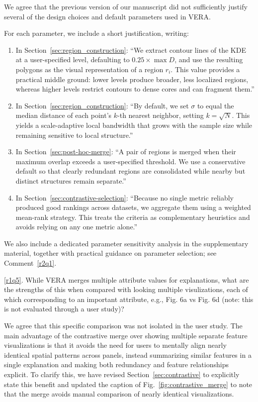 \documentclass[11pt]{article}
\newcounter{rtaskno}
\newcommand{\rtask}[1]{\refstepcounter{rtaskno}\label{#1}}
\newcommand{\reviewc}[2]{\begin{leftbar}\noindent\rtask{#1}\ref{#1}. #2\end{leftbar}\vspace*{-4mm}}
\newcommand{\answer}[1]{\noindent #1\par\vspace{2mm}}
\newlength{\leftbarwidth}
\newlength{\leftbarsep}
\renewenvironment{leftbar}{%
    \def\FrameCommand{{\color{black}{\vrule width \leftbarwidth\relax\hspace {\leftbarsep}}}}%
    \MakeFramed {\advance \hsize -\width \FrameRestore }%
}{\endMakeFramed}
\begin{document}
\answer{%
We agree that the previous version of our manuscript did not sufficiently justify several of the design choices and default parameters used in VERA.

For each parameter, we include a short justification, writing:
\begin{enumerate}
    \item In Section~\ref{sec:region_construction}: ``We extract contour lines of the KDE at a user-specified level, defaulting to $0.25 \times \max D$, and use the resulting polygons as the visual representation of a region $r_i$.
    This value provides a practical middle ground: lower levels produce broader, less localized regions, whereas higher levels restrict contours to dense cores and can fragment them.''
    \item In Section~\ref{sec:region_construction}: ``By default, we set $\sigma$ to equal the median distance of each point's $k$-th nearest neighbor, setting $k=\sqrt{N}$. This yields a scale-adaptive local bandwidth that grows with the sample size while remaining sensitive to local structure.''
    \item In Section~\ref{sec:post-hoc-merge}: ``A pair of regions is merged when their maximum overlap exceeds a user-specified threshold. We use a conservative default so that clearly redundant regions are consolidated while nearby but distinct structures remain separate.''
    \item In Section~\ref{sec:contrastive-selection}: ``Because no single metric reliably produced good rankings across datasets, we aggregate them using a weighted mean-rank strategy. This treats the criteria as complementary heuristics and avoids relying on any one metric alone.''
\end{enumerate}

We also include a dedicated parameter sensitivity analysis in the supplementary material, together with practical guidance on parameter selection; see Comment~\ref{r2q1}.
}


\reviewc{r1q5}{While VERA merges multiple attribute values for explanations, what are the strengths of this when compared with looking multiple visulizations, each of which corresponding to an important attribute, e.g., Fig. 6a vs Fig. 6d (note: this is not evaluated through a user study)?}

\answer{%
We agree that this specific comparison was not isolated in the user study. The main advantage of the contrastive merge over showing multiple separate feature visualizations is that it avoids the need for users to mentally align nearly identical spatial patterns across panels, instead summarizing similar features in a single explanation and making both redundancy and feature relationships explicit. To clarify this, we have revised Section~\ref{sec:contrastive} to explicitly state this benefit and updated the caption of Fig.~\ref{fig:contrastive_merge} to note that the merge avoids manual comparison of nearly identical visualizations.
}
\end{document}
